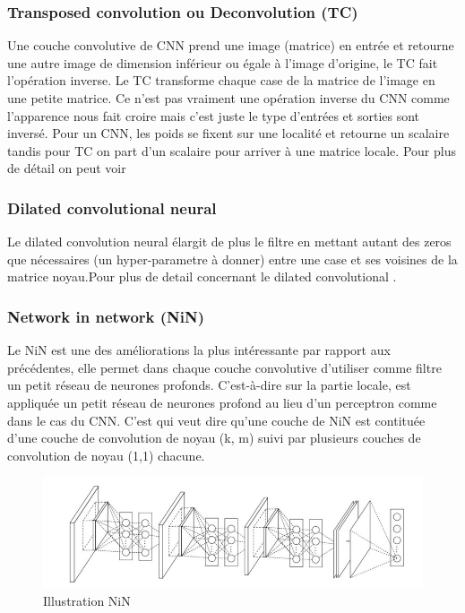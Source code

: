 \subsubsection{Transposed convolution ou Deconvolution (TC)}
Une couche convolutive de CNN prend une image (matrice) en entrée et retourne une autre image de dimension inférieur ou égale à l'image d'origine, le TC fait l'opération inverse. Le TC transforme chaque case de la matrice de l'image en une petite matrice. Ce n'est pas vraiment une opération inverse du CNN comme l'apparence nous fait croire mais c'est juste le type d'entrées et sorties sont inversé. Pour un CNN, les poids se fixent sur une localité et retourne un scalaire tandis pour TC on part d'un scalaire pour arriver à une matrice locale. Pour plus de détail on peut voir \cite{transcd1, transcd2, transcd3,transcd4, transcd5}  
\subsubsection{Dilated convolutional neural}
Le dilated convolution neural élargit de plus le filtre en mettant autant des zeros que nécessaires (un hyper-parametre à donner) entre une case et ses voisines de la matrice noyau.Pour plus de detail concernant le dilated convolutional \cite{dilate1, dilate2, dilate3, dilate4}.
\subsubsection{Network in network (NiN)}\cite{nin1}
Le NiN est une des améliorations la plus intéressante par rapport aux précédentes, elle permet dans chaque couche convolutive d'utiliser comme filtre un petit réseau de neurones profonds. C'est-à-dire sur la partie locale, est appliquée un petit réseau de neurones profond au lieu d'un perceptron comme dans le cas du CNN. C'est qui veut dire qu'une couche de NiN est contituée d'une couche de convolution de noyau (k, m) suivi par plusieurs couches de convolution de noyau (1,1) chacune.

\begin{figure}[H]
    \centering
    \includegraphics[scale = 0.5]{images/nin.jpg}
    \caption{Illustration NiN}
\end{figure}
